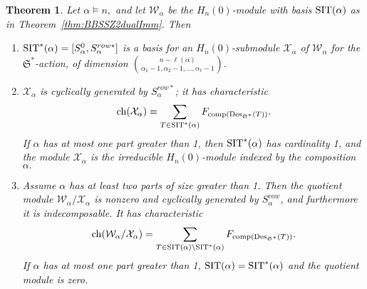 \documentclass[12pt,letterpaper]{amsart}
\newtheorem{theorem}{Theorem}[section]
\theoremstyle{definition}
\DeclareMathOperator{\comp}{comp}
\newcommand{\dI}{\mathfrak{S}^*}
\DeclareMathOperator{\Des}{Des}
\newcommand{\hn}{H_n(0)}
\begin{document}
\begin{theorem}\label{thm:dualImm-submodule-quotient} Let $\alpha\vDash n,$ and let $\mathcal{W}_\alpha$ be the $\hn$-module with basis $\operatorname{SIT}(\alpha)$ as in Theorem~\ref{thm:BBSSZ2dualImm}.  Then 
\begin{enumerate}
\item
$\operatorname{SIT}^*(\alpha)=[S^0_\alpha, S^{row*}_\alpha]$  is a basis for an  $\hn$-submodule $\mathcal{X}_\alpha$ of $\mathcal{W}_\alpha$ for the $\dI$-action, of dimension $\binom{n-\ell(\alpha)}{\alpha_1-1,\alpha_2-1,\ldots, \alpha_\ell-1}.$
\item $\mathcal{X}_\alpha$ is cyclically generated by $S^{row*}_\alpha$;  it has characteristic 
\[\chr(\mathcal{X}_\alpha)= \sum_{T\in \SIT^*(\alpha)} F_{\comp(\Des_{\dI}(T))}.\]
If $\alpha$ has at most one part greater than 1, then $\operatorname{SIT}^*(\alpha)$ has cardinality 1, and the module $\mathcal{X}_\alpha$ is the irreducible $\hn$-module indexed by the composition $\alpha.$
\item Assume $\alpha$ has at least two parts of size greater than 1. Then the quotient module $\mathcal{W}_\alpha/\mathcal{X}_\alpha$ is  nonzero and cyclically generated by $S^{row}_\alpha$, and furthermore it is indecomposable.  It has characteristic 
\[\chr(\mathcal{W}_\alpha/\mathcal{X}_\alpha)
= \sum_{T\in \SIT(\alpha)\setminus \SIT^*(\alpha)} F_{\comp(\Des_{\dI}(T))}.\]
If $\alpha$ has at most one part greater than 1, $\operatorname{SIT}(\alpha)=\operatorname{SIT}^*(\alpha)$ and the quotient module is zero.
\end{enumerate}
\end{theorem}
\end{document}
